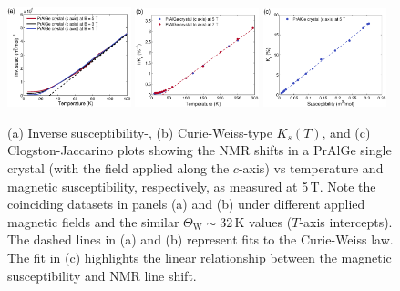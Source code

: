 \documentclass[aps,prb,a4paper,10pt,twocolumn,showpacs,floatfix,superscriptaddress,preprintnumbers,longbibliography]{revtex4-2}
\newcommand{\tcr}[1]{\textcolor{black}{#1}}
\begin{document}
\begin{figure}[!thb]
	\includegraphics[width=0.32\textwidth,angle=0]{figures/PrAlGe/invsusceptibilityvsT.eps}%
	\includegraphics[width=0.32\textwidth]{figures/PrAlGe/27AlinvS_vs_T}%
	\includegraphics[width=0.32\textwidth]{figures/PrAlGe/27AlCJ_plot}%
    \caption{\label{fig:magnetometry}(a) Inverse susceptibility-, (b)
    Curie-Weiss-type $K_s(T)$, and (c) Clogston-Jaccarino plots
    showing the NMR shifts in a PrAlGe single crystal (with the field
    applied along the $c$-axis) vs temperature and magnetic
    susceptibility, respectively, as measured at 5\,T. 
    Note the coinciding datasets in panels (a) and (b) under
    different applied magnetic fields and the similar
    $\Theta_\mathrm{W}\sim 32$\,K values ($T$-axis intercepts). 
    The dashed lines in (a) and (b) represent fits to the 
    Curie-Weiss law. The fit in (c) highlights the linear 
    relationship between the magnetic susceptibility and NMR line shift.}
\end{figure}
%
\end{document}
